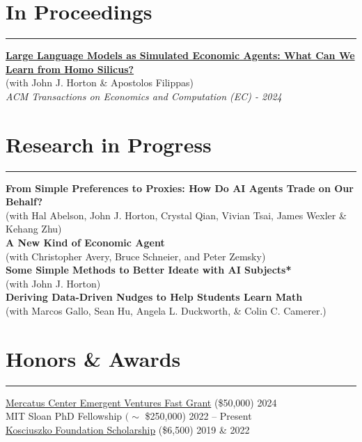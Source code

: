 \documentclass[11.25pt]{article}
\begin{document}
\section*{In Proceedings} \vspace{-1mm} \hrule
\vspace{3mm}
\href{https://dl.acm.org/doi/10.1145/3670865.3673513}{\textbf{Large Language Models as Simulated Economic Agents: What Can We Learn from Homo Silicus?}} \\ (with John J. Horton \& Apostolos Filippas) \\ \textit{ACM Transactions on Economics and Computation (EC) - 2024}

\newpage \clearpage

\section*{Research in Progress} \vspace{-1mm} \hrule
\vspace{3mm}

\noindent\textbf{From Simple Preferences to Proxies: How Do AI Agents Trade on Our Behalf?}\\ 
(with Hal Abelson, John J. Horton, Crystal Qian, Vivian Tsai, James Wexler \& Kehang Zhu)\\

\noindent\textbf{A New Kind of Economic Agent}\\ 
(with Christopher Avery, Bruce Schneier, and Peter Zemsky)\\

\noindent\textbf{Some Simple Methods to Better Ideate with AI Subjects*}\\ 
(with John J. Horton)\\

\noindent\textbf{Deriving Data-Driven Nudges to Help Students Learn Math} \\
(with Marcos Gallo, Sean Hu, Angela L. Duckworth, \& Colin C. Camerer.) 

\section*{Honors \& Awards} \hrule
\vspace{3mm}
\href{https://www.mercatus.org/emergent-ventures}{Mercatus Center Emergent Ventures Fast Grant} (\$50,000) \hfill 2024\\
MIT Sloan PhD Fellowship $(\sim$ \$250,000) \hfill 2022 -- Present\\
\href{https://thekf.org/scholarship/tuition-scholarships/}{Kosciuszko Foundation Scholarship} (\$6,500) \hfill 2019 \& 2022\\
\end{document}
